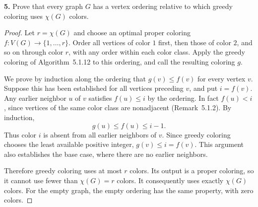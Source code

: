 \documentclass[12pt]{amsart}
\theoremstyle{conjecture}
\theoremstyle{definition}
\theoremstyle{question}
\theoremstyle{theorem}
\begin{document}
    \noindent\textbf{5.} Prove that every graph $G$ has a vertex ordering relative to which
    greedy coloring uses $\chi(G)$ colors.

    \begin{proof}
        Let $r=\chi(G)$ and choose an optimal proper coloring
        $f:V(G)\to\{1,\ldots,r\}$.  Order all vertices of color $1$ first,
        then those of color $2$, and so on through color $r$, with any order
        within each color class.  Apply the greedy coloring of
        Algorithm~5.1.12 to this ordering, and call the resulting coloring $g$.

        We prove by induction along the ordering that $g(v)\leq f(v)$ for
        every vertex $v$.  Suppose this has been established for all vertices
        preceding $v$, and put $i=f(v)$.  Any earlier neighbor $u$ of $v$
        satisfies $f(u)\leq i$ by the ordering.  In fact $f(u)<i$, since
        vertices of the same color class are nonadjacent
        (Remark~5.1.2).  By induction,
        \[
            g(u)\leq f(u)\leq i-1.
        \]
        Thus color $i$ is absent from all earlier neighbors of $v$.  Since
        greedy coloring chooses the least available positive integer,
        $g(v)\leq i=f(v)$.  This argument also establishes the base case,
        where there are no earlier neighbors.

        Therefore greedy coloring uses at most $r$ colors.  Its output is a
        proper coloring, so it cannot use fewer than $\chi(G)=r$ colors.
        It consequently uses exactly $\chi(G)$ colors.  For the empty graph,
        the empty ordering has the same property, with zero colors.
    \end{proof}
\end{document}
